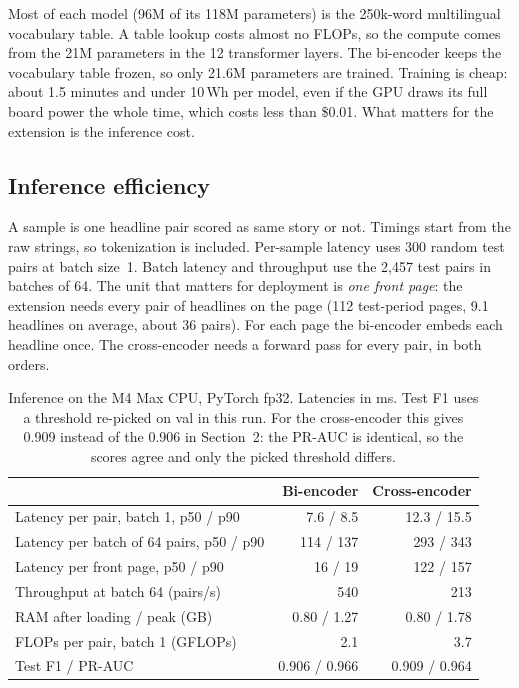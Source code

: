 Most of each model (96M of its 118M parameters) is the 250k-word multilingual vocabulary table. A table lookup costs almost no FLOPs, so the compute comes from the 21M parameters in the 12 transformer layers. The bi-encoder keeps the vocabulary table frozen, so only 21.6M parameters are trained. Training is cheap: about 1.5 minutes and under 10\,Wh per model, even if the GPU draws its full board power the whole time, which costs less than \$0.01. What matters for the extension is the inference cost.

\subsection{Inference efficiency}

A sample is one headline pair scored as same story or not. Timings start from the raw strings, so tokenization is included. Per-sample latency uses 300 random test pairs at batch size~1. Batch latency and throughput use the 2,457 test pairs in batches of 64. The unit that matters for deployment is \emph{one front page}: the extension needs every pair of headlines on the page (112 test-period pages, 9.1 headlines on average, about 36 pairs). For each page the bi-encoder embeds each headline once. The cross-encoder needs a forward pass for every pair, in both orders.

\begin{table}[H]
\centering
\caption{Inference on the M4 Max CPU, PyTorch fp32. Latencies in ms. Test F1 uses a threshold re-picked on val in this run. For the cross-encoder this gives 0.909 instead of the 0.906 in Section~2: the PR-AUC is identical, so the scores agree and only the picked threshold differs.}
\label{tab:infer-eff}
\small
\begin{tabular}{@{}lrr@{}}
\toprule
 & Bi-encoder & Cross-encoder \\
\midrule
Latency per pair, batch 1, p50 / p90 & 7.6 / 8.5 & 12.3 / 15.5 \\
Latency per batch of 64 pairs, p50 / p90 & 114 / 137 & 293 / 343 \\
Latency per front page, p50 / p90 & 16 / 19 & 122 / 157 \\
Throughput at batch 64 (pairs/s) & 540 & 213 \\
RAM after loading / peak (GB) & 0.80 / 1.27 & 0.80 / 1.78 \\
FLOPs per pair, batch 1 (GFLOPs) & 2.1 & 3.7 \\
Test F1 / PR-AUC & 0.906 / 0.966 & 0.909 / 0.964 \\
\bottomrule
\end{tabular}
\end{table}

